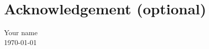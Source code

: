 \chapter*{Acknowledgement (optional)}
\begingroup
\raggedright
{} %
\setlength{\parskip}{0.5\baselineskip}

\lipsum[1-2]

\begin{flushright}
Your name \\
\mydate\today
\end{flushright}

\endgroup